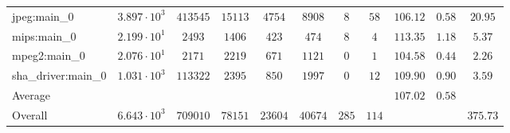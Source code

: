 \begin{tabular}{|l|c|c|c|c|c|c|c|c|c|c|}
jpeg:main\_0            & $ 3.897 \cdot 10^{3}  $ & $ 413545 $ & $ 15113 $ & $ 4754  $ & $ 8908  $ & $ 8   $ & $ 58  $ & $ 106.12      $ & $ 0.58    $ & $ 20.95   $ \\
mips:main\_0            & $ 2.199 \cdot 10^{1}  $ & $ 2493   $ & $ 1406  $ & $ 423   $ & $ 474   $ & $ 8   $ & $ 4   $ & $ 113.35      $ & $ 1.18    $ & $ 5.37    $ \\
mpeg2:main\_0           & $ 2.076 \cdot 10^{1}  $ & $ 2171   $ & $ 2219  $ & $ 671   $ & $ 1121  $ & $ 0   $ & $ 1   $ & $ 104.58      $ & $ 0.44    $ & $ 2.26    $ \\
sha\_driver:main\_0     & $ 1.031 \cdot 10^{3}  $ & $ 113322 $ & $ 2395  $ & $ 850   $ & $ 1997  $ & $ 0   $ & $ 12  $ & $ 109.90      $ & $ 0.90    $ & $ 3.59    $ \\
\hline
Average                 & $                     $ & $        $ & $       $ & $       $ & $       $ & $     $ & $     $ & $ 107.02      $ & $ 0.58    $ & $         $ \\
\hline
Overall                 & $ 6.643 \cdot 10^{3}  $ & $ 709010 $ & $ 78151 $ & $ 23604 $ & $ 40674 $ & $ 285 $ & $ 114 $ & $             $ & $         $ & $ 375.73  $ \\
\hline
\end{tabular}
